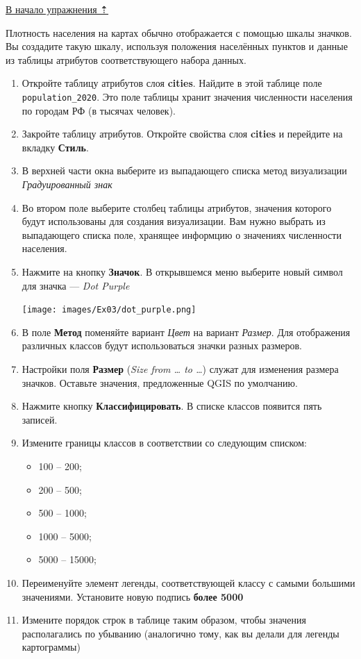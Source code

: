 \documentclass[
  12pt,
]{book}
\providecommand{\tightlist}{%
  \setlength{\itemsep}{0pt}\setlength{\parskip}{0pt}}
\begin{document}
\protect\hyperlink{map-design-population}{В начало упражнения ⇡}

Плотность населения на картах обычно отображается с помощью шкалы значков. Вы создадите такую шкалу, используя положения населённых пунктов и данные из таблицы атрибутов соответствующего набора данных.

\begin{enumerate}
\def\labelenumi{\arabic{enumi}.}
\item
  Откройте таблицу атрибутов слоя \textbf{cities}. Найдите в этой таблице поле \texttt{population\_2020}. Это поле таблицы хранит значения численности населения по городам РФ (в тысячах человек).
\item
  Закройте таблицу атрибутов. Откройте свойства слоя \textbf{cities} и перейдите на вкладку \textbf{Стиль}.
\item
  В верхней части окна выберите из выпадающего списка метод визуализации \emph{Градуированный знак}
\item
  Во втором поле выберите столбец таблицы атрибутов, значения которого будут использованы для создания визуализации. Вам нужно выбрать из выпадающего списка поле, хранящее информцию о значениях численности населения.
\item
  Нажмите на кнопку \textbf{Значок}. В открывшемся меню выберите новый символ для значка --- \emph{Dot Purple}

  \texttt{[image: images/Ex03/dot\_purple.png]}
\item
  В поле \textbf{Метод} поменяйте вариант \emph{Цвет} на вариант \emph{Размер}. Для отображения различных классов будут использоваться значки разных размеров.
\item
  Настройки поля \textbf{Размер} (\emph{Size from \ldots{} to \ldots{}}) служат для изменения размера значков. Оставьте значения, предложенные QGIS по умолчанию.
\item
  Нажмите кнопку \textbf{Классифицировать}. В списке классов появится пять записей.
\item
  Измените границы классов в соответствии со следующим списком:

  \begin{itemize}
  \tightlist
  \item
    100 -- 200;
  \item
    200 -- 500;
  \item
    500 -- 1000;
  \item
    1000 -- 5000;
  \item
    5000 -- 15000;
  \end{itemize}
\item
  Переименуйте элемент легенды, соответствующей классу с самыми большими значениями. Установите новую подпись \textbf{более 5000}
\item
  Измените порядок строк в таблице таким образом, чтобы значения располагались по убыванию (аналогично тому, как вы делали для легенды картограммы)


\end{enumerate}
\end{document}
